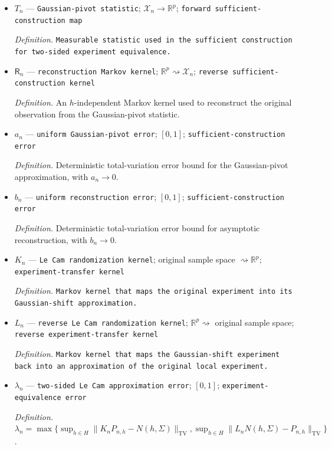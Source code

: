 \documentclass{article}
\begin{document}
\begin{itemize}
  \item \(T_n\) --- \texttt{Gaussian-\allowbreak{}pivot statistic}; \(\mathcal X_n\to\mathbb R^p\); \texttt{forward sufficient-\allowbreak{}construction map}
  \par\smallskip\noindent\emph{Definition.} \texttt{Measurable statistic used in the sufficient construction for two-\allowbreak{}sided experiment equivalence.}
  \item \(\mathsf R_n\) --- \texttt{reconstruction Markov kernel}; \(\mathbb R^p\rightsquigarrow\mathcal X_n\); \texttt{reverse sufficient-\allowbreak{}construction kernel}
  \par\smallskip\noindent\emph{Definition.} An \(h\)-independent Markov kernel used to reconstruct the original observation from the Gaussian-pivot statistic.
  \item \(a_n\) --- \texttt{uniform Gaussian-\allowbreak{}pivot error}; \([0,1]\); \texttt{sufficient-\allowbreak{}construction error}
  \par\smallskip\noindent\emph{Definition.} Deterministic total-variation error bound for the Gaussian-pivot approximation, with \(a_n\to0\).
  \item \(b_n\) --- \texttt{uniform reconstruction error}; \([0,1]\); \texttt{sufficient-\allowbreak{}construction error}
  \par\smallskip\noindent\emph{Definition.} Deterministic total-variation error bound for asymptotic reconstruction, with \(b_n\to0\).
  \item \(K_n\) --- \texttt{Le Cam randomization kernel}; original sample space \(\rightsquigarrow\mathbb R^p\); \texttt{experiment-\allowbreak{}transfer kernel}
  \par\smallskip\noindent\emph{Definition.} \texttt{Markov kernel that maps the original experiment into its Gaussian-\allowbreak{}shift approximation.}
  \item \(L_n\) --- \texttt{reverse Le Cam randomization kernel}; \(\mathbb R^p\rightsquigarrow\) original sample space; \texttt{reverse experiment-\allowbreak{}transfer kernel}
  \par\smallskip\noindent\emph{Definition.} \texttt{Markov kernel that maps the Gaussian-\allowbreak{}shift experiment back into an approximation of the original local experiment.}
  \item \(\lambda_n\) --- \texttt{two-\allowbreak{}sided Le Cam approximation error}; \([0,1]\); \texttt{experiment-\allowbreak{}equivalence error}
  \par\smallskip\noindent\emph{Definition.} \(\lambda_n=\max\{\sup_{h\in H}\lVert K_nP_{n,h}-N(h,\Sigma)\rVert_{\mathrm{TV}},\sup_{h\in H}\lVert L_nN(h,\Sigma)-P_{n,h}\rVert_{\mathrm{TV}}\}\).

\end{itemize}
\end{document}

